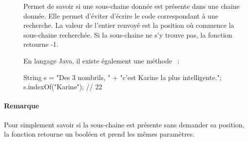 	\begin{description}
	\item[]	
	
		Permet de savoir si une sous-chaine donnée est présente dans une chaine
		donnée.  Elle permet d’éviter d’écrire le code correspondant à une
		recherche.  La valeur de l’entier renvoyé est la position où commence la
		sous-chaine recherchée.  Si la sous-chaine ne s’y trouve pas, la
		fonction retourne -1.

		En langage Java, il existe également une méthode ~:

		\begin{java}
String s = "Des 3 nombrils, " 
	+ "c'est Karine la plus intelligente.";
s.indexOf("Karine"); // 22
		\end{java}

	\end{description}

	\paragraph{Remarque} Pour simplement savoir si la sous-chaine est présente 
	sans demander sa position, la fonction  retourne un booléen et 
	prend les mêmes paramètres. 
	


